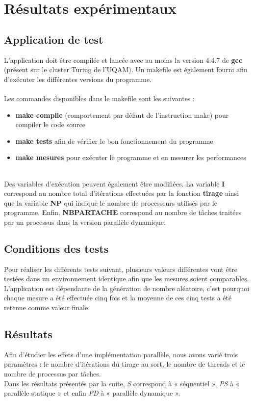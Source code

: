 \documentclass[a4paper,12pt]{article}
\begin{document}
\section{Résultats expérimentaux}

\subsection{Application de test}
L'application doit être compilée et lancée avec au moins la version 4.4.7 de \textbf{gcc} (présent sur le cluster Turing de l’UQAM). Un makefile est également fourni afin d'exécuter les différentes versions du programme.\\\\
Les commandes disponibles dans le makefile sont les suivantes :
\begin{itemize}
	\item{\textbf{make compile}} (comportement par défaut de l'instruction make) pour compiler le code source
	\item{\textbf{make tests}} afin de vérifier le bon fonctionnement du programme
	\item{\textbf{make mesures}} pour exécuter le programme et en mesurer les performances
\end{itemize}~~\\
Des variables d'exécution peuvent également être modifiées. La variable \textbf{I} correspond au nombre total d'itérations effectuées par la fonction \textbf{tirage} ainsi que la variable \textbf{NP} qui indique le nombre de processeurs utilisés par le programme. Enfin, \textbf{NBPARTACHE} correspond au nombre de tâches traitées par un processus dans la version parallèle dynamique.


\subsection{Conditions des tests}
Pour réaliser les différents tests suivant, plusieurs valeurs différentes vont être testées dans un environnement identique afin que les mesures soient comparables. L'application est dépendante de la génération de nombre aléatoire, c'est pourquoi chaque mesure a été effectuée cinq fois et la moyenne de ces cinq tests a été retenue comme valeur finale. 

\subsection{Résultats}
Afin d'étudier les effets d'une implémentation parallèle, nous avons varié trois paramètres : le nombre d'itérations du tirage au sort, le nombre de threads et le nombre de processus par tâches. \\
Dans les résultats présentés par la suite, \textit{S} correspond à « séquentiel », \textit{PS} à « parallèle statique » et enfin \textit{PD} à « parallèle dynamique ». 
\end{document}
